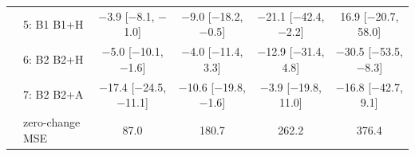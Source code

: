 \begin{table}[h]
{\begin{tabular}{llcccc}
 & 5: B1 \cto{} B1+H & $-$3.9 [$-$8.1, $-$1.0] & $-$9.0 [$-$18.2, $-$0.5] & $-$21.1 [$-$42.4, $-$2.2] & 16.9 [$-$20.7, 58.0] \\
 & 6: B2 \cto{} B2+H & $-$5.0 [$-$10.1, $-$1.6] & $-$4.0 [$-$11.4, 3.3] & $-$12.9 [$-$31.4, 4.8] & $-$30.5 [$-$53.5, $-$8.3] \\
 & 7: B2 \cto{} B2+A & $-$17.4 [$-$24.5, $-$11.1] & $-$10.6 [$-$19.8, $-$1.6] & $-$3.9 [$-$19.8, 11.0] & $-$16.8 [$-$42.7, 9.1] \\
 & zero-change MSE & 87.0 & 180.7 & 262.2 & 376.4 \\
\bottomrule
\end{tabular}
}
\end{table}

